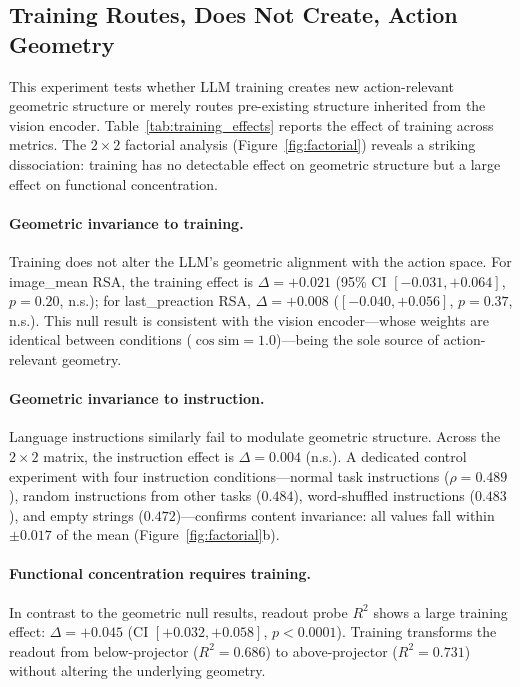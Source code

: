 \subsection{Training Routes, Does Not Create, Action Geometry}
\label{sec:training_routing}

This experiment tests whether LLM training creates new action-relevant geometric structure or merely routes pre-existing structure inherited from the vision encoder.
Table~\ref{tab:training_effects} reports the effect of training across metrics.
The $2 \times 2$ factorial analysis (Figure~\ref{fig:factorial}) reveals a striking dissociation: training has no detectable effect on geometric structure but a large effect on functional concentration.

\paragraph{Geometric invariance to training.}
Training does not alter the LLM's geometric alignment with the action space.
For image\_mean RSA, the training effect is $\Delta = +0.021$ (95\% CI $[-0.031, +0.064]$, $p = 0.20$, n.s.); for last\_preaction RSA, $\Delta = +0.008$ ($[-0.040, +0.056]$, $p = 0.37$, n.s.).
This null result is consistent with the vision encoder---whose weights are identical between conditions ($\cos\text{sim} = 1.0$)---being the sole source of action-relevant geometry.

\paragraph{Geometric invariance to instruction.}
Language instructions similarly fail to modulate geometric structure.
Across the $2 \times 2$ matrix, the instruction effect is $\Delta = 0.004$ (n.s.).
A dedicated control experiment with four instruction conditions---normal task instructions ($\rho = 0.489$), random instructions from other tasks ($0.484$), word-shuffled instructions ($0.483$), and empty strings ($0.472$)---confirms content invariance: all values fall within $\pm 0.017$ of the mean (Figure~\ref{fig:factorial}b).

\paragraph{Functional concentration requires training.}
In contrast to the geometric null results, readout probe $R^2$ shows a large training effect: $\Delta = +0.045$ (CI $[+0.032, +0.058]$, $p < 0.0001$).
Training transforms the readout from below-projector ($R^2 = 0.686$) to above-projector ($R^2 = 0.731$) without altering the underlying geometry.

